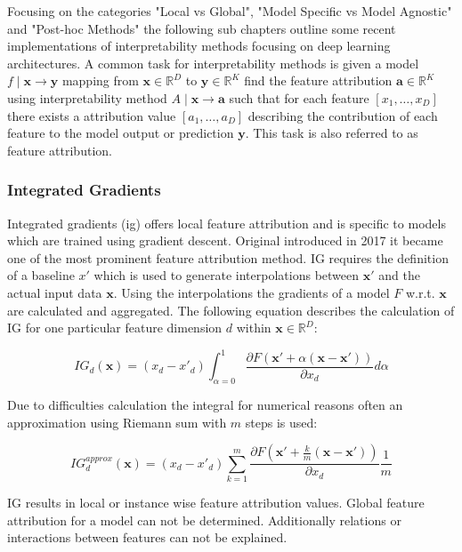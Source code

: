 \documentclass[../main.tex]{subfiles}
\begin{document}
Focusing on the categories "Local vs Global", "Model Specific vs Model Agnostic" and "Post-hoc Methods" the following sub chapters outline some recent implementations of interpretability methods focusing on deep learning architectures. A common task for interpretability methods is given a model $f \mid \mathbf{x} \rightarrow \mathbf{y} $ mapping from $\mathbf{x} \in \mathbb{R}^D$ to $\mathbf{y} \in \mathbb{R}^K$ find the feature attribution $\mathbf{a} \in \mathbb{R}^K$ using interpretability method $A \mid \mathbf{x} \rightarrow \mathbf{a}$ such that for each feature $[x_1, \ldots, x_D]$ there exists a attribution value $[a_1, \ldots, a_D]$ describing the contribution of each feature to the model output or prediction $\mathbf{y}$. This task is also referred to as feature attribution.

\subsubsection{Integrated Gradients}

Integrated gradients (\acs{ig}) offers local feature attribution and is specific to models which are trained using gradient descent. Original introduced in 2017 \cite{sundararajan_axiomatic_2017} it became one of the most prominent feature attribution method. IG requires the definition of a baseline $x'$ which is used to generate interpolations between $\mathbf{x}'$ and the actual input data $\mathbf{x}$. Using the interpolations the gradients of a model $F$ w.r.t. $\mathbf{x}$ are calculated and aggregated. The following equation describes the calculation of IG for one particular feature dimension $d$ within $\mathbf{x} \in \mathbb{R}^D$:

\begin{equation}
    IG_d(\mathbf{x}) = (x_d - x'_d) \int_{\alpha=0}^1 \frac {\partial F(\mathbf{x}'+\alpha (\mathbf{x}-\mathbf{x}'))}{\partial x_d} d\alpha
\end{equation}

Due to difficulties calculation the integral for numerical reasons often an approximation using Riemann sum with $m$ steps is used:

\begin{equation}
    IG_d^{approx}(\mathbf{x}) = (x_d - x'_d) \sum_{k=1}^m \frac {\partial F(\mathbf{x}'+\frac{k}{m} (\mathbf{x}-\mathbf{x}'))}{\partial x_d} \frac{1}{m}
\end{equation}

IG results in local or instance wise feature attribution values. Global feature attribution for a model can not be determined. Additionally relations or interactions between features can not be explained. 
\end{document}
